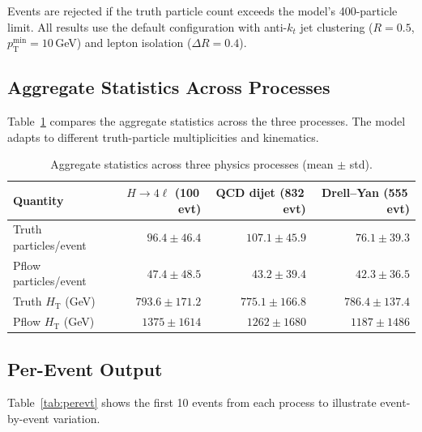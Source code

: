 \documentclass[11pt,a4paper]{article}
\begin{document}
\noindent
Events are rejected if the truth particle count exceeds the model's
400-particle limit. All results use the default configuration with anti-$k_t$
jet clustering ($R = 0.5$, $p_\mathrm{T}^\mathrm{min} = 10$\,GeV) and lepton
isolation ($\Delta R = 0.4$).

\subsection{Aggregate Statistics Across Processes}

Table~\ref{tab:aggregate} compares the aggregate statistics across the three processes.
The model adapts to different truth-particle multiplicities and kinematics.

\begin{table}[H]
\centering
\caption{Aggregate statistics across three physics processes (mean $\pm$ std).}
\label{tab:aggregate}
\begin{tabular}{@{}lrrr@{}}
\toprule
\textbf{Quantity}
  & \textbf{$H{\to}4\ell$ (100\,evt)}
  & \textbf{QCD dijet (832\,evt)}
  & \textbf{Drell--Yan (555\,evt)} \\
\midrule
Truth particles/event  & $96.4 \pm 46.4$   & $107.1 \pm 45.9$  & $76.1 \pm 39.3$ \\
Pflow particles/event  & $47.4 \pm 48.5$   & $43.2 \pm 39.4$   & $42.3 \pm 36.5$ \\
Truth $H_\mathrm{T}$ (GeV) & $793.6 \pm 171.2$ & $775.1 \pm 166.8$ & $786.4 \pm 137.4$ \\
Pflow $H_\mathrm{T}$ (GeV) & $1375 \pm 1614$   & $1262 \pm 1680$   & $1187 \pm 1486$ \\
\bottomrule
\end{tabular}
\end{table}

\subsection{Per-Event Output}

Table~\ref{tab:perevt} shows the first 10 events from each process to illustrate
event-by-event variation.
\end{document}
